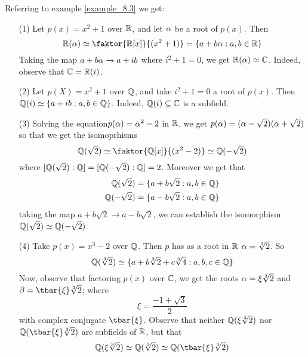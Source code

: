 \begin{example}\label{example_8.4}
  Referring to example \ref{example_8.3} we get:
  \begin{enumerate}
    \item[(1)] Let $p(x)=x^2+1$ over $\mathbb{R}$, and let $\alpha$ be a root of
      $p(x)$. Then
      \begin{equation*}
        \R(\a) \simeq \faktor{\R[x]}{(x^2+1)}=\{a+b\a : a,b \in \R\}
      \end{equation*}
      Taking the map $a+b\alpha \xrightarrow{} a+ib$ where $i^2+1=0$, we
      get $\mathbb{R}(\alpha) \simeq \mathbb{C}$. Indeed, observe that $\mathbb{C}=\mathbb{R}(i)$.

    \item[(2)] Let $p(X)=x^2+1$ over $\mathbb{Q}$, and take $i^2+1=0$ a root
      of $p(x)$. Then $\mathbb{Q}(i) \simeq \{a+ib : a,b \in \mathbb{Q}\}$. Indeed,
      $\mathbb{Q}(i) \subseteq \mathbb{C}$ is a subfield.

    \item[(3)] Solving the equation$p(\alpha)=\alpha^2-2$ in $\mathbb{R}$, we get
      $p(\alpha)=(\alpha-\sqrt{2})(\alpha+\sqrt{2})$ so that we get the
      isomoprhisms
      \begin{equation*}
        \Q(\sqrt{2}) \simeq \faktor{\Q[x]}{(x^2-2)} \simeq \Q(-\sqrt{2})
      \end{equation*}
      where $[\mathbb{Q}(\sqrt{2}):\mathbb{Q}]=[\mathbb{Q}(-\sqrt{2}):\mathbb{Q}]=2$. Moreover we get
      that
      \begin{align*}
        \mathbb{Q}(\sqrt{2})  &=  \{a+b\sqrt{2} : a,b \in \mathbb{Q}\}  \\
        \mathbb{Q}(-\sqrt{2}) &=  \{a-b\sqrt{2} : a,b \in \mathbb{Q}\}
      \end{align*}
      taking the map $a+b\sqrt{2} \xrightarrow{} a-b\sqrt{2}$, we can
      establish the isomorphism $\mathbb{Q}(\sqrt{2}) \simeq \mathbb{Q}(-\sqrt{2})$.

    \item[(4)] Take $p(x)=x^3-2$ over $\mathbb{Q}$. Then $p$ has as a root in
      $\mathbb{R}$ $\alpha=\sqrt[3]{2}$. So
      \begin{equation*}
        \mathbb{Q}(\sqrt[3]{2}) \simeq
      \{a+b\sqrt[3]{2}+c\sqrt[3]{4} : a,b,c \in \mathbb{Q}\}
      \end{equation*}
      Now, observe that factoring $p(x)$ over $\mathbb{C}$, we get the roots
      $\alpha=\xi\sqrt[3]{2}$ and $\b=\tbar{\xi}\sqrt[3]{2}$; where
      \begin{equation*}
        \xi=\frac{-1+\sqrt{3}}{2}
      \end{equation*}
      with complex conjugate $\tbar{\xi}$. Observe that neither
      $\mathbb{Q}(\xi\sqrt[3]{2})$ nor $\Q(\tbar{\xi}\sqrt[3]{2})$ are
      subfields of $\mathbb{R}$, but that
      \begin{equation*}
        \Q(\xi\sqrt[3]{2}) \simeq \Q(\sqrt[3]{2}) \simeq
        \Q(\tbar{\xi}\sqrt[3]{2})
      \end{equation*}


\end{enumerate}
\end{example}
